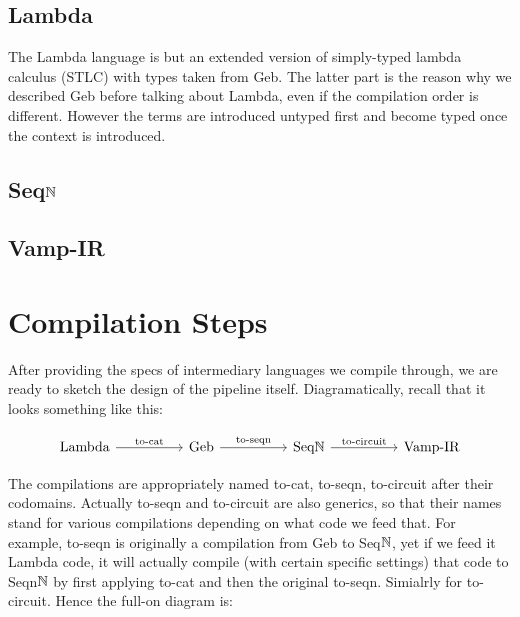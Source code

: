 \subsection{Lambda}

The Lambda language is but an extended version of simply-typed lambda calculus (STLC) with types taken from Geb. The latter part is the reason why we described Geb before talking about Lambda, even if the compilation order is different. However the terms are introduced untyped first and become typed once the context is introduced.

\subsection{Seq$\mathbb{N}$}

\subsection{Vamp-IR}

\section{Compilation Steps}

After providing the specs of intermediary languages we compile through, we are ready to sketch the design of the pipeline itself. Diagramatically, recall that it looks something like this:

\[\begin{tikzcd}
	{\text{Lambda}} && {\text{Geb}} && {\text{Seq$\N$} } && {\text{Vamp-IR}}
	\arrow["{\text{to-cat}}", from=1-1, to=1-3]
	\arrow["{\text{to-seqn}}", from=1-3, to=1-5]
	\arrow["{\text{to-circuit}}", from=1-5, to=1-7]
\end{tikzcd}\]

The compilations are appropriately named to-cat, to-seqn, to-circuit after their codomains. Actually to-seqn and to-circuit are also generics, so that their names stand for various compilations depending on what code we feed that. For example, to-seqn is originally a compilation from Geb to Seq$\mathbb{N}$, yet if we feed it Lambda code, it will actually compile (with certain specific settings) that code to Seqn$\mathbb{N}$ by first applying to-cat and then the original to-seqn. Simialrly for to-circuit. Hence the full-on diagram is:


